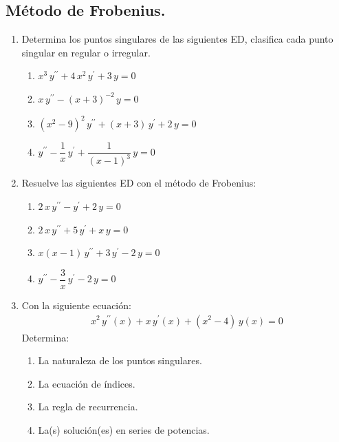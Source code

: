 \documentclass[hidelinks,12pt]{article}
\newcommand{\pderivada}[1]{\ensuremath{{#1}^{\prime}}}
\newcommand{\sderivada}[1]{\ensuremath{{#1}^{\prime \prime}}}
\begin{document}
\subsection*{Método de Frobenius.}

\begin{enumerate}
    \item Determina los puntos singulares de las siguientes ED, clasifica cada punto singular en regular o irregular.
        \begin{enumerate}
            \item $x^{3} \, \sderivada{y} + 4 \, x^{2} \, \pderivada{y} + 3 \, y = 0$
            \item $x \, \sderivada{y} - (x + 3)^{-2} \, y = 0$
            \item $(x^{2} - 9)^{2} \, \sderivada{y} + (x + 3) \, \pderivada{y} + 2 \, y = 0$
            \item $\sderivada{y} - \dfrac{1}{x} \, \pderivada{y} + \dfrac{1}{(x - 1)^{3}} \, y = 0$
        \end{enumerate}
    \item Resuelve las siguientes ED con el método de Frobenius:
        \begin{enumerate} 
            \item $2 \, x \, \sderivada{y} - \pderivada{y} + 2 \, y = 0$
            \item $2 \, x \, \sderivada{y} + 5 \, \pderivada{y} + x \, y = 0$
            \item $x (x - 1) \, \sderivada{y} + 3 \, \pderivada{y} - 2 \, y = 0$
            \item $\sderivada{y} - \dfrac{3}{x} \, \pderivada{y} - 2 \, y = 0$
        \end{enumerate}
    \item Con la siguiente ecuación:
        \begin{align*}
            x^{2} \, \sderivada{y} (x) + x \, \pderivada{y} (x) + (x^{2} - 4) \, y (x) = 0
        \end{align*}
        Determina:
        \begin{enumerate}
            \item La naturaleza de los puntos singulares.
            \item La ecuación de índices.
            \item La regla de recurrencia.
            \item La(s) solución(es) en series de potencias.
        \end{enumerate}
\end{enumerate}
\end{document}
